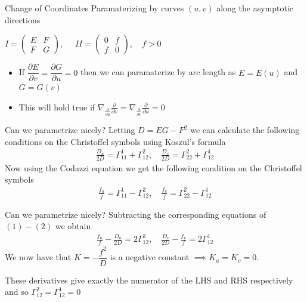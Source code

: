 \begin{frame}[c]{Change of Coordinates}
	Paramaterizing by curves $(u,v)$ along the asymptotic directions
	\begin{center}
		$I = \begin{pmatrix}
				E & F \\ F & G
			\end{pmatrix}, \quad$ $II = \begin{pmatrix}
				0 & f \\ f & 0
			\end{pmatrix}, \quad f> 0$
	\end{center}
	\pause
	\begin{itemize}
		\item<2-> If $\dfrac{\partial E}{\partial v} = \dfrac{\partial G}{\partial u} = 0$ then
		      we can paramaterize by arc length as $E = E(u)$ and $G = G(v)$
		\item<3-> This will hold true if $\nabla_{\frac{\partial}{\partial u}}
			      \frac{\partial}{\partial v} = \nabla_{\frac{\partial}{\partial v}}
			      \frac{\partial}{\partial u} = 0 $
	\end{itemize}
\end{frame}

\begin{frame}[c]{Can we parametrize nicely?}
	Letting $D = EG - F^2$ we can calculate the following conditions on the Christoffel symbols using Koszul's formula
	\begin{align}
		\frac{D_u}{2D} = \Gamma_{11}^1 + \Gamma_{12}^2, \quad \frac{D_v}{2D} = \Gamma_{22}^2 + \Gamma_{12}^1
	\end{align}
	\pause
	Now using the Codazzi equation we get the following condition on the Christoffel symbols
	\begin{align}
		\frac{f_u}{f} = \Gamma_{11}^1 - \Gamma_{12}^2, \quad \frac{f_v}{f} = \Gamma_{22}^2 - \Gamma_{12}^1
	\end{align}
\end{frame}

\begin{frame}[c]{Can we parametrize nicely?}
	Subtracting the corresponding equations of $(1) - (2)$ we obtain
	\begin{align}
		\frac{f_u}{f} - \frac{D_u}{2D}= 2\Gamma_{12}^2, \quad \frac{D_v}{2D} - \frac{f_v}{f} = 2\Gamma_{12}^1
	\end{align}
	\pause
	We now have that $K = -\dfrac{f^2}{D}$ is a negative constant $\implies K_u =
		K_v =0$.
	\begin{remark}
		These derivatives give exactly the numerator of the LHS and RHS respectively and so
		$\Gamma_{12}^2 = \Gamma_{12}^1 = 0$
	\end{remark}
\end{frame}

